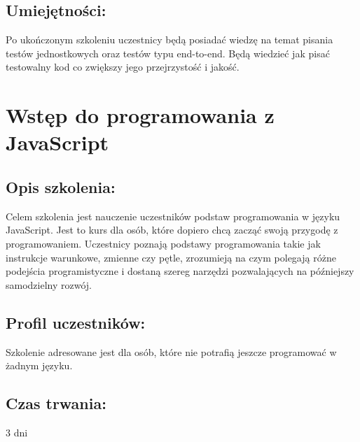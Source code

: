 \documentclass{article}[10pt]
\begin{document}
	\subsection*{Umiejętności:}
\begin{adjustwidth}{2cm}{}
\justifying
	
Po ukończonym szkoleniu uczestnicy będą posiadać wiedzę na temat pisania testów jednostkowych oraz testów typu end-to-end. Będą wiedzieć jak pisać testowalny kod co zwiększy jego przejrzystość i jakość. 



\end{adjustwidth}

\newpage


    
	\section{Wstęp do programowania z JavaScript}

	\subsection*{Opis szkolenia:}
	\begin{adjustwidth}{2cm}{}
\justifying
		Celem szkolenia jest nauczenie uczestników podstaw programowania w języku JavaScript. Jest to kurs dla osób, które dopiero chcą zacząć swoją przygodę z programowaniem. Uczestnicy poznają podstawy programowania takie jak instrukcje warunkowe, zmienne czy pętle, zrozumieją na czym polegają różne podejścia programistyczne i dostaną szereg narzędzi pozwalających na późniejszy samodzielny rozwój.
	\end{adjustwidth}
	\subsection*{Profil uczestników:}
\begin{adjustwidth}{2cm}{}
\justifying
	Szkolenie adresowane jest dla osób, które nie potrafią jeszcze programować w żadnym języku.
\end{adjustwidth}
	\subsection*{Czas trwania:}
\begin{adjustwidth}{2cm}{}
	3 dni
\end{adjustwidth}
\end{document}
